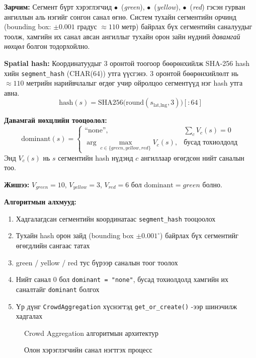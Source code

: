 \textbf{Зарчим:} Сегмент бүрт хэрэглэгчид {\color{green}$\bullet$}~(\textit{green}), {\color{olive}$\bullet$}~(\textit{yellow}), {\color{red}$\bullet$}~(\textit{red}) гэсэн гурван ангиллын аль нэгийг сонгон санал өгнө. Систем тухайн сегментийн орчинд (bounding box: $\pm 0.001$ градус $\approx 110$ метр) байрлах бүх сегментийн саналуудыг тоолж, хамгийн их санал авсан ангиллыг тухайн орон зайн нүдний \emph{давамгай нөхцөл} болгон тодорхойлно.

\textbf{Spatial hash:} Координатуудыг 3 оронтой тоогоор бөөрөнхийлж SHA-256 hash хийн \texttt{segment\_hash} (CHAR(64)) утга үүсгэнэ. 3 оронтой бөөрөнхийлөлт нь $\approx 110$ метрийн нарийвчлалыг өгдөг учир ойролцоо сегментүүд нэг hash утга авна.
\begin{equation}
\text{hash}(s) = \text{SHA256}\big(\text{round}(s_{\text{lat,lng}}, 3)\big)[:64]
\end{equation}

\textbf{Давамгай нөхцлийн тооцоолол:}
\begin{equation}
\text{dominant}(s) = \begin{cases}
\text{``none''}, & \sum_{c} V_c(s) = 0 \\
\arg\max\limits_{c \in \{green, yellow, red\}} V_c(s), & \text{бусад тохиолдолд}
\end{cases}
\end{equation}
Энд $V_c(s)$ нь $s$ сегментийн hash нүдэнд $c$ ангиллаар өгөгдсөн нийт саналын тоо.

\textbf{Жишээ:} $V_{green} = 10$, $V_{yellow} = 3$, $V_{red} = 6$ бол $\text{dominant} = green$ болно.

\textbf{Алгоритмын алхмууд:}
\begin{enumerate}
    \item Хадгалагдсан сегментийн координатаас \texttt{segment\_hash} тооцоолох
    \item Тухайн hash орон зайд (bounding box $\pm 0.001^{\circ}$) байрлах бүх сегментийг өгөгдлийн сангаас татах
    \item green / yellow / red тус бүрээр саналын тоог тоолох
    \item Нийт санал 0 бол \texttt{dominant = "none"}, бусад тохиолдолд хамгийн их саналтайг \texttt{dominant} болгох
    \item Үр дүнг \texttt{CrowdAggregation} хүснэгтэд \texttt{get\_or\_create()} -ээр шинэчилж хадгалах
\end{enumerate}
\begin{figure}[H]
    \centering
    \caption{Crowd Aggregation алгоритмын архитектур}
    \label{fig:crowdAgg}
\end{figure}
\begin{figure}[H]
    \centering
    \caption{Олон хэрэглэгчийн санал нэгтгэх процесс}
    \label{fig:crowd-flow}
\end{figure}
